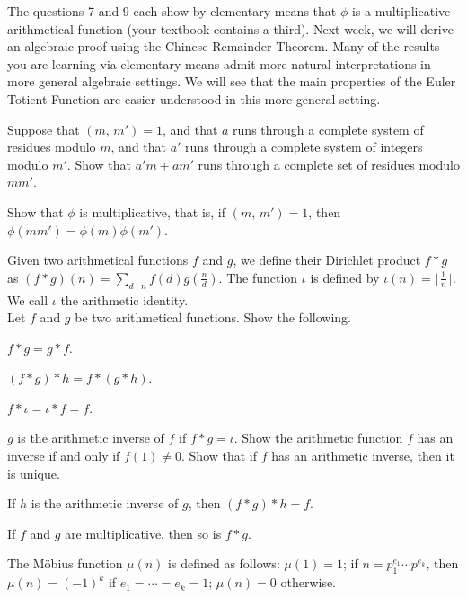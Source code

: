 \documentclass[a4paper,11pt]{article}
\theoremstyle{mythm}
\theoremstyle{mydef}
\begin{document}
The questions 7 and 9 each show by elementary means that $\phi$ is a
multiplicative arithmetical function (your textbook contains a third). Next
week, we will derive an algebraic proof using the Chinese Remainder Theorem.
Many of the results you are learning via elementary means admit more natural
interpretations in more general algebraic settings. We will see that the main
properties of the Euler Totient Function are easier understood in this more
general setting. \\

\begin{enumerate*}[{\bf (a)}]
\item Suppose that $(m,\,m')=1$, and that $a$ runs through a complete system of
  residues modulo $m$, and that $a'$ runs through a complete system of integers
  modulo $m'$. Show that $a'm+am'$ runs through a complete set of residues
  modulo $mm'$.
\item Show that $\phi$ is multiplicative, that is, if $(m,\,m')=1$, then
  $\phi(mm')=\phi(m)\phi(m')$.
\end{enumerate*}

Given two arithmetical functions $f$ and $g$, we define their Dirichlet product
$f*g$ as $(f*g)(n)=\sum_{d \mid n}f(d)g(\frac{n}{d})$. The function $\iota$ is
defined by $\iota(n)=\lfloor \frac{1}{n} \rfloor$. We call $\iota$ the
arithmetic identity. \\

 Let $f$ and $g$ be two arithmetical functions. Show
the following.
\begin{enumerate*}[{\bf (a)}]
\item $f*g = g*f$.
\item $(f*g)*h=f*(g*h)$.
\item $f*\iota = \iota*f=f$.
\item $g$ is the arithmetic inverse of $f$ if $f*g=\iota$. Show the arithmetic
  function $f$ has an inverse if and only if $f(1) \neq 0$. Show that if $f$ has
  an arithmetic inverse, then it is unique.
\item If $h$ is the arithmetic inverse of $g$, then $(f*g)*h=f$.
\item If $f$ and $g$ are multiplicative, then so is $f*g$. \\
\end{enumerate*}

The M\"{o}bius function $\mu(n)$ is defined as follows: $\mu(1)=1$; if
$n=p_1^{e_1} \cdots p^{e_k}$, then $\mu(n)=(-1)^k$ if $e_1=\cdots=e_k=1$;
$\mu(n)=0$ otherwise. \\
\end{document}
